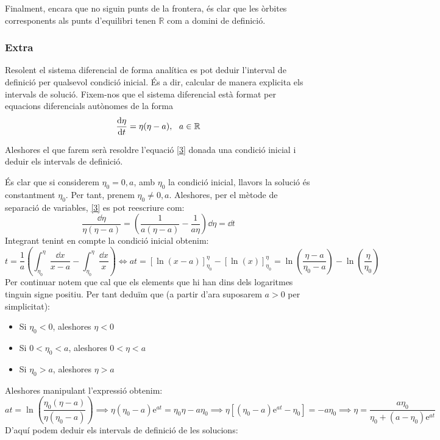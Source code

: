 \documentclass[10pt,a4paper]{article}
\renewcommand{\exp}[1]{\mathrm{e}^{#1}} %
\newcommand{\R}{\mathbb R}
\begin{document}
Finalment, encara que no siguin punts de la frontera, és clar que les òrbites corresponents als punts d'equilibri tenen $\R$ com a domini de definició.

\subsubsection*{Extra}
Resolent el sistema diferencial de forma analítica es pot deduir l'interval de definició per qualsevol condició inicial. És a dir, calcular de manera explicita els intervals de solució. Fixem-nos que el sistema diferencial està format per equacions diferencials autònomes de la forma
\begin{equation}\label{3}
  \dv{\eta}{t}=\eta(\eta-a), \ \ a\in \R
\end{equation}

Aleshores el que farem serà resoldre l'equació \eqref{3} donada una condició inicial i deduir els intervals de definició.
\par
És clar que si considerem $\eta_0=0, a$, amb $\eta_0$ la condició inicial, llavors la solució és constantment $\eta_0$. Per tant, prenem $\eta_0\neq 0, a$. Aleshores, per el mètode de separació de variables, \eqref{3} es pot reescriure com:
\begin{equation}
  \frac{\dd{\eta}}{\eta(\eta-a)}=\left(\frac{1}{a(\eta-a)}-\frac{1}{a\eta}\right)\dd{\eta}=\dd{t}
\end{equation}
Integrant tenint en compte la condició inicial obtenim:
\begin{equation}
  t=\frac{1}{a}\left(\int_{\eta_0}^{\eta}\frac{\dd{x}}{x-a}-\int_{\eta_0}^{\eta}\frac{\dd{x}}{x}\right)\iff at=\left[\ln(x-a)\right]_{\eta_0}^\eta-\left[\ln(x)\right]_{\eta_0}^\eta=\ln\left(\frac{\eta-a}{\eta_0-a}\right)-\ln\left(\frac{\eta}{\eta_0}\right)
\end{equation}
Per continuar notem que cal que els elements que hi han dins dels logaritmes tinguin signe positiu. Per tant deduïm que (a partir d'ara suposarem $a>0$ per simplicitat):
\begin{itemize}
  \item Si $\eta_0<0$, aleshores $\eta<0$
  \item Si $0<\eta_0<a$, aleshores $0<\eta<a$
  \item Si $\eta_0>a$, aleshores $\eta>a$
\end{itemize}
Aleshores manipulant l'expressió obtenim:
\begin{equation*}
  at=\ln\left(\frac{\eta_0(\eta-a)}{\eta(\eta_0-a)}\right) \implies \eta(\eta_0-a)\exp{at}=\eta_0\eta-a\eta_0 \implies \eta[(\eta_0-a)\exp{at}-\eta_0]=-a\eta_0\implies \eta=\frac{a\eta_0}{\eta_0+(a-\eta_0)\exp{at}}
\end{equation*}
D'aquí podem deduir els intervals de definició de les solucions:
\end{document}
